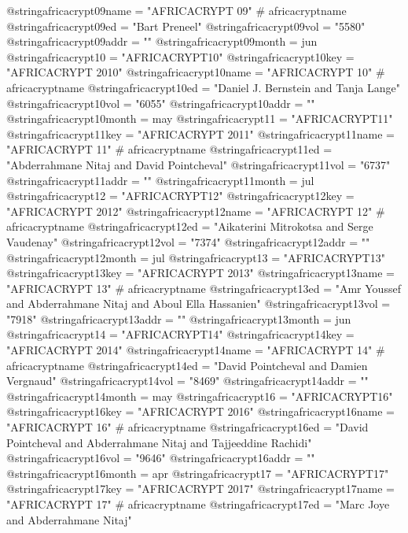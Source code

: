 @string{africacrypt09name =     "AFRICACRYPT 09" # africacryptname}
@string{africacrypt09ed =       "Bart Preneel"}
@string{africacrypt09vol =      "5580"}
@string{africacrypt09addr =     ""}
@string{africacrypt09month =    jun}
@string{africacrypt10 =         "AFRICACRYPT10"}
@string{africacrypt10key =      "AFRICACRYPT 2010"}
@string{africacrypt10name =     "AFRICACRYPT 10" # africacryptname}
@string{africacrypt10ed =       "Daniel J. Bernstein and Tanja Lange"}
@string{africacrypt10vol =      "6055"}
@string{africacrypt10addr =     ""}
@string{africacrypt10month =    may}
@string{africacrypt11 =         "AFRICACRYPT11"}
@string{africacrypt11key =      "AFRICACRYPT 2011"}
@string{africacrypt11name =     "AFRICACRYPT 11" # africacryptname}
@string{africacrypt11ed =       "Abderrahmane Nitaj and David Pointcheval"}
@string{africacrypt11vol =      "6737"}
@string{africacrypt11addr =     ""}
@string{africacrypt11month =    jul}
@string{africacrypt12 =         "AFRICACRYPT12"}
@string{africacrypt12key =      "AFRICACRYPT 2012"}
@string{africacrypt12name =     "AFRICACRYPT 12" # africacryptname}
@string{africacrypt12ed =       "Aikaterini Mitrokotsa and Serge Vaudenay"}
@string{africacrypt12vol =      "7374"}
@string{africacrypt12addr =     ""}
@string{africacrypt12month =    jul}
@string{africacrypt13 =         "AFRICACRYPT13"}
@string{africacrypt13key =      "AFRICACRYPT 2013"}
@string{africacrypt13name =     "AFRICACRYPT 13" # africacryptname}
@string{africacrypt13ed =       "Amr Youssef and Abderrahmane Nitaj and Aboul Ella Hassanien"}
@string{africacrypt13vol =      "7918"}
@string{africacrypt13addr =     ""}
@string{africacrypt13month =    jun}
@string{africacrypt14 =         "AFRICACRYPT14"}
@string{africacrypt14key =      "AFRICACRYPT 2014"}
@string{africacrypt14name =     "AFRICACRYPT 14" # africacryptname}
@string{africacrypt14ed =       "David Pointcheval and Damien Vergnaud"}
@string{africacrypt14vol =      "8469"}
@string{africacrypt14addr =     ""}
@string{africacrypt14month =    may}
@string{africacrypt16 =         "AFRICACRYPT16"}
@string{africacrypt16key =      "AFRICACRYPT 2016"}
@string{africacrypt16name =     "AFRICACRYPT 16" # africacryptname}
@string{africacrypt16ed =       "David Pointcheval and Abderrahmane Nitaj and Tajjeeddine Rachidi"}
@string{africacrypt16vol =      "9646"}
@string{africacrypt16addr =     ""}
@string{africacrypt16month =    apr}
@string{africacrypt17 =         "AFRICACRYPT17"}
@string{africacrypt17key =      "AFRICACRYPT 2017"}
@string{africacrypt17name =     "AFRICACRYPT 17" # africacryptname}
@string{africacrypt17ed =       "Marc Joye and Abderrahmane Nitaj"}
